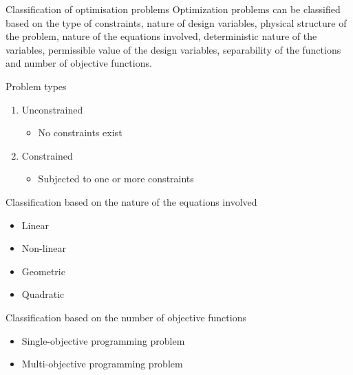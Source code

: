 \documentclass[10pt,aspectratio=169,notes]{beamer} %
\begin{document}
\note{}
\begin{frame}{Classification of optimisation problems}
Optimization problems can be classified based on
the type of constraints, nature of design variables,
physical structure of the problem, nature of the
equations involved, deterministic nature of the
variables, permissible value of the design variables,
separability of the functions and number of objective
functions.	
\end{frame}
\note{}
\begin{frame}{Problem types}
\begin{enumerate}
	\item Unconstrained
	\begin{itemize}
		\item No constraints exist
	\end{itemize}
	\item Constrained
	\begin{itemize}
		\item Subjected to one or more constraints 
	\end{itemize}
\end{enumerate}	
\end{frame}
\begin{frame}{Classification  based on the nature of the equations
involved}
\begin{itemize}
	\item Linear
	\item Non-linear
	\item Geometric
	\item Quadratic
\end{itemize}
\end{frame}
\note{}
\begin{frame}{Classification  based on the number of objective functions}
\begin{itemize}
	\item Single-objective programming problem
	\item Multi-objective programming problem
\end{itemize}
\end{frame}
\end{document}
